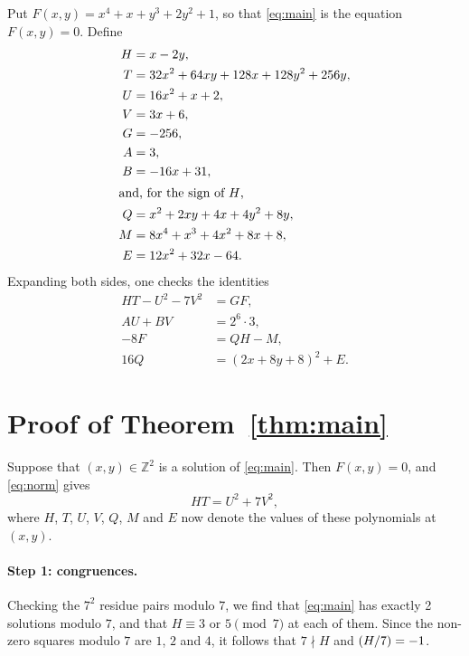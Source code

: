 \documentclass[11pt]{article}
\newcommand{\Z}{\mathbb{Z}}
\newcommand{\leg}[2]{\mathchoice{\biggl(\dfrac{#1}{#2}\biggr)}{(#1/#2)}{(#1/#2)}{(#1/#2)}}
\begin{document}
Put $F(x,y)=x^{4}+x+y^{3}+2y^{2}+1$, so that \eqref{eq:main} is the equation $F(x,y)=0$. Define
\begin{align*}
H&=x-2y,\\
T&=32x^{2}+64xy+128x+128y^{2}+256y,\\
U&=16x^{2}+x+2,\\
V&=3x+6,\\
G&=-256,\\
A&=3,\\
B&=-16x+31,\\
\intertext{and, for the sign of $H$,}
Q&=x^{2}+2xy+4x+4y^{2}+8y,\\
M&=8x^{4}+x^{3}+4x^{2}+8x+8,\\
E&=12x^{2}+32x-64.
\end{align*}
Expanding both sides, one checks the identities
\begin{align}
HT-U^2-7V^2&=GF,\label{eq:norm}\\
AU+BV&=2^{6}\cdot 3,\label{eq:bezout}\\
-8F&=QH-M,\label{eq:sign}\\
16Q&=(2x+8y+8)^2+E.\label{eq:sign2}
\end{align}

\section{Proof of Theorem~\ref{thm:main}}

Suppose that $(x,y)\in\Z^2$ is a solution of \eqref{eq:main}. Then $F(x,y)=0$, and \eqref{eq:norm} gives
\begin{equation}\label{eq:HT}
HT=U^2+7V^2,
\end{equation}
where $H$, $T$, $U$, $V$, $Q$, $M$ and $E$ now denote the values of these polynomials at $(x,y)$.

\paragraph{Step 1: congruences.} Checking the $7^2$ residue pairs modulo $7$, we find that \eqref{eq:main} has exactly 2 solutions modulo $7$, and that $H\equiv3\text{ or }5\pmod{7}$ at each of them. Since the non-zero squares modulo $7$ are $1$, $2$ and $4$, it follows that $7\nmid H$ and $\leg{H}{7}=-1$.
\end{document}
